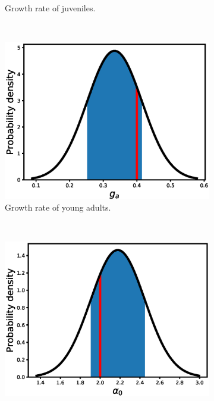 \documentclass[12pt, table]{article}
\begin{document}
\begin{figure}[H]
\begin{subfigure}[b]{0.45\textwidth}
       \caption{Growth rate of  juveniles.}
       \label{fig2a}
   \end{subfigure}
   ~ %
   \begin{subfigure}[b]{0.45\textwidth}
       \includegraphics[width=1\textwidth, height=0.24\textheight]{figexple1/fgj}
        \caption{Growth rate of young adults.}
       \label{fig2b}
   \end{subfigure}\\
   \begin{subfigure}[b]{0.45\textwidth}
       \includegraphics[width=1\textwidth, height=0.24\textheight]{figexple1/falpha0}
      

\end{subfigure}
\end{figure}
\end{document}
